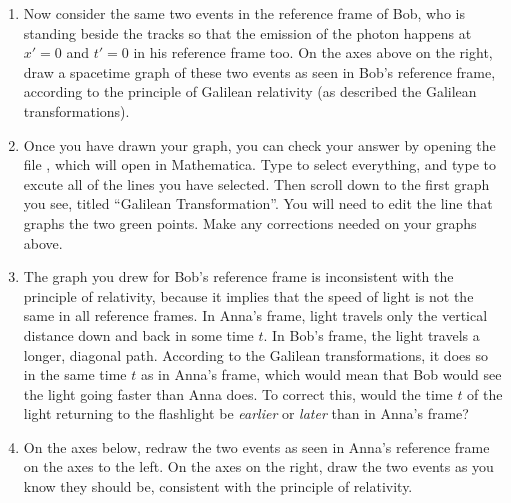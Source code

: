\begin{enumerate}

\item 
Now consider the same two events in the reference frame of Bob, who is standing beside the tracks so that the emission of the photon  happens at $x'=0$ and $t'=0$ in his reference frame too.
On the axes above on the right, draw a spacetime graph of these two events as seen in Bob's reference frame, according to the principle of Galilean relativity (as described the Galilean transformations).

\item Once you have drawn your graph, you can check your answer by 
opening the file , which will open in Mathematica.  Type  to select everything, and type  to excute all of the lines you have selected.  Then scroll down to the first graph you see, titled ``Galilean Transformation''.  You will need to edit the line that graphs the two green points.  Make any corrections needed on your graphs above.

\item The graph you drew for Bob's reference frame is inconsistent with the principle of relativity, because it implies that the speed of light is not the same in all reference frames.  In Anna's frame, light travels only the vertical distance down and back in some time $t$.  In Bob's frame, the light travels a longer, diagonal path.  According to the Galilean transformations, it does so in the same time $t$ as in Anna's frame, which would mean that Bob would see the light going faster than Anna does.  To correct this, would the time $t$ of the light returning to the flashlight be \textit{earlier} or \textit{later} than in Anna's frame?
\answerspace{0.4in}

\pagebreak[2]
\item On the axes below, redraw the two events as seen in Anna's reference frame on the axes to the left.  On the axes on the right, draw the two events as you know they should be, consistent with the principle of relativity.

\begin{center}
\begin{lab_axis}[lab_noticks_4quads,
	width=1.5in, height=1.5in,
	xlabel={$x$},
	ylabel={$t$},
	title style={at={(0.5,1)}},
	title={Anna's Frame}
	]
\end{lab_axis}
\hspace{0.2in}
\hspace{0.2in}
\begin{lab_axis}[lab_noticks_4quads,
	width=1.5in, height=1.5in,
	xlabel={$x'$},
	ylabel={$t'$},
	title style={at={(0.5,1)}},
	title={Bob's Frame}
	]
\end{lab_axis}
\end{center}


\end{enumerate}
